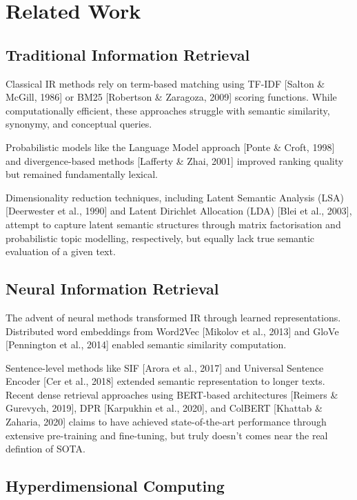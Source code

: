 \documentclass[scifiniti,article,submit,moreauthors,twocolumn,twoside]{Definitions/scifiniti_jams}
\begin{document}
\section{Related Work}

\subsection{Traditional Information Retrieval}

Classical IR methods rely on term-based matching using TF-IDF [Salton & McGill, 1986] or BM25 [Robertson & Zaragoza, 2009] scoring functions. While computationally efficient, these approaches struggle with semantic similarity, synonymy, and conceptual queries.

Probabilistic models like the Language Model approach [Ponte & Croft, 1998] and divergence-based methods [Lafferty & Zhai, 2001]\cite{ref-book1} improved ranking quality but remained fundamentally lexical.

Dimensionality reduction techniques, including Latent Semantic Analysis (LSA) [Deerwester et al., 1990] and Latent Dirichlet Allocation (LDA) [Blei et al., 2003], attempt to capture latent semantic structures through matrix factorisation and probabilistic topic modelling, respectively, but equally lack true semantic evaluation of a given text.

\subsection{Neural Information Retrieval}

The advent of neural methods transformed IR through learned representations. Distributed word embeddings from Word2Vec [Mikolov et al., 2013] and GloVe [Pennington et al., 2014] enabled semantic similarity computation.

Sentence-level methods like SIF [Arora et al., 2017] and Universal Sentence Encoder [Cer et al., 2018] extended semantic representation to longer texts. Recent dense retrieval approaches using BERT-based architectures [Reimers & Gurevych, 2019], DPR [Karpukhin et al., 2020], and ColBERT [Khattab & Zaharia, 2020] claims to have achieved state-of-the-art performance through extensive pre-training and fine-tuning, but truly doesn't comes near the real defintion of SOTA.

\subsection{Hyperdimensional Computing}
\end{document}
